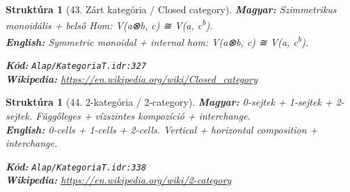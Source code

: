 \documentclass[11pt,a4paper,twocolumn]{article}
\newtheorem{struktura}[tetel]{Struktúra}
\begin{document}
\begin{struktura}[43. Zárt kategória / Closed category]

\textbf{Magyar:} Szimmetrikus monoidális + belső Hom: V(a⊗b, c) ≅ V(a, c\textsuperscript{b}).\\

\textbf{English:} Symmetric monoidal + internal hom: V(a⊗b, c) ≅ V(a, c\textsuperscript{b}).\\

\begin{center}
\end{center}

\textbf{Kód:} \texttt{Alap/KategoriaT.idr:327}\\
\textbf{Wikipedia:} \url{https://en.wikipedia.org/wiki/Closed_category}

\end{struktura}

\vspace{0.5cm}

\begin{struktura}[44. 2-kategória / 2-category]

\textbf{Magyar:} 0-sejtek + 1-sejtek + 2-sejtek. Függőleges + vízszintes kompozíció + interchange.\\

\textbf{English:} 0-cells + 1-cells + 2-cells. Vertical + horizontal composition + interchange.\\

\begin{center}
\end{center}

\textbf{Kód:} \texttt{Alap/KategoriaT.idr:338}\\
\textbf{Wikipedia:} \url{https://en.wikipedia.org/wiki/2-category}

\end{struktura}

\vspace{0.5cm}
\end{document}
